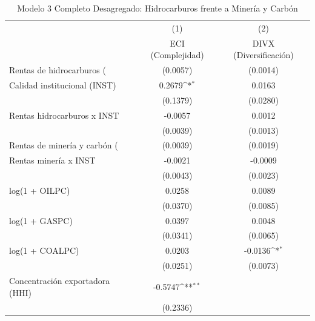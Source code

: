 \begin{table}[htbp]\centering
\def\sym#1{\ifmmode^{#1}\else\(^{#1}\)\fi}
\caption{Modelo 3 Completo Desagregado: Hidrocarburos frente a Minería y Carbón}
\begin{tabular}{l*{2}{c}}
\toprule
                    &\multicolumn{1}{c}{(1)}&\multicolumn{1}{c}{(2)}\\
                    &\multicolumn{1}{c}{ECI (Complejidad)}&\multicolumn{1}{c}{DIVX (Diversificación)}\\
\midrule
Rentas de hidrocarburos (%
                    &    (0.0057)         &    (0.0014)         \\
\addlinespace
Calidad institucional (INST)&      0.2679\sym{*}  &      0.0163         \\
                    &    (0.1379)         &    (0.0280)         \\
\addlinespace
Rentas hidrocarburos x INST&     -0.0057         &      0.0012         \\
                    &    (0.0039)         &    (0.0013)         \\
\addlinespace
Rentas de minería y carbón (%
                    &    (0.0039)         &    (0.0019)         \\
\addlinespace
Rentas minería x INST&     -0.0021         &     -0.0009         \\
                    &    (0.0043)         &    (0.0023)         \\
\addlinespace
log(1 + OILPC)      &      0.0258         &      0.0089         \\
                    &    (0.0370)         &    (0.0085)         \\
\addlinespace
log(1 + GASPC)      &      0.0397         &      0.0048         \\
                    &    (0.0341)         &    (0.0065)         \\
\addlinespace
log(1 + COALPC)     &      0.0203         &     -0.0136\sym{*}  \\
                    &    (0.0251)         &    (0.0073)         \\
\addlinespace
Concentración exportadora (HHI)&     -0.5747\sym{**} &                     \\
                    &    (0.2336)         &                     \\

\end{tabular}
\end{table}
